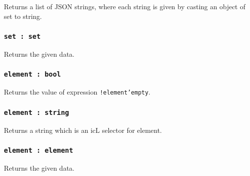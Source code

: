 Returns a list of JSON strings, where each string is given by casting an object of set to string.

\subsubsection{\texttt{set : set}}

Returns the given data.

\subsubsection{\texttt{element : bool}}

Returns the value of expression \texttt{!element'empty}.

\subsubsection{\texttt{element : string}}

Returns a string which is an icL selector for element.

\subsubsection{\texttt{element : element}}

Returns the given data.
